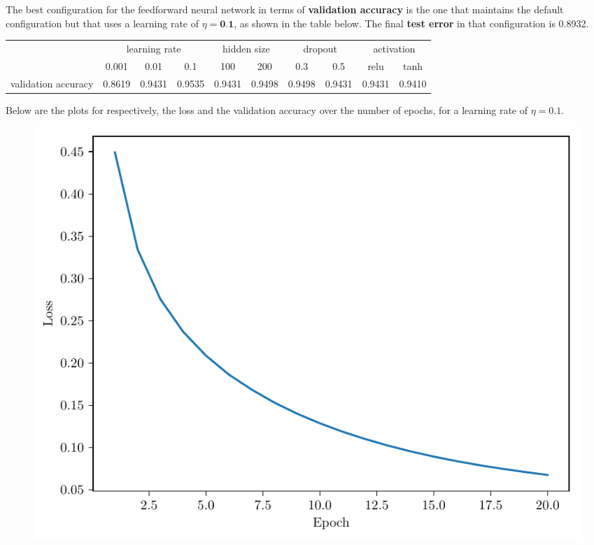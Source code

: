 \begin{questions}
        \question %
        The best configuration for the feedforward neural network in terms of \textbf{validation accuracy}
        is the one that maintains the default configuration but that uses a learning rate of $\eta = \textbf{0.1}$, 
        as shown in the table below. The final \textbf{test error} in that configuration is 0.8932.
        \begin{table}[h!]
            \centering
            \begin{tabular}{c|ccc|cc|cc|cc}
                                & \multicolumn{3}{c|}{learning rate}                            & \multicolumn{2}{c|}{hidden size} & \multicolumn{2}{c|}{dropout}     & \multicolumn{2}{c}{activation}   \\ \cline{2-10} 
                                & \multicolumn{1}{c|}{0.001} & \multicolumn{1}{c|}{0.01} & 0.1  & \multicolumn{1}{c|}{100}  & 200  & \multicolumn{1}{c|}{0.3}  & 0.5  & \multicolumn{1}{c|}{relu} & tanh \\ \hline
            validation accuracy & \multicolumn{1}{c|}{0.8619} & \multicolumn{1}{c|}{0.9431} & 0.9535 & \multicolumn{1}{c|}{0.9431} & 0.9498 & \multicolumn{1}{c|}{0.9498} & 0.9431 & \multicolumn{1}{c|}{0.9431} & 0.9410
            \end{tabular}
        \end{table}
        
        \newpage

        Below are the plots for respectively, the loss and the validation accuracy over the number of epochs,
        for a learning rate of $\eta = 0.1$.

        \begin{figure}[H]
            \centering
            \includegraphics[scale = 0.75]{feedforward-training-loss-0.1-100-1-0.3-relu-sgd-16.pdf}
        \end{figure}


\end{questions}
